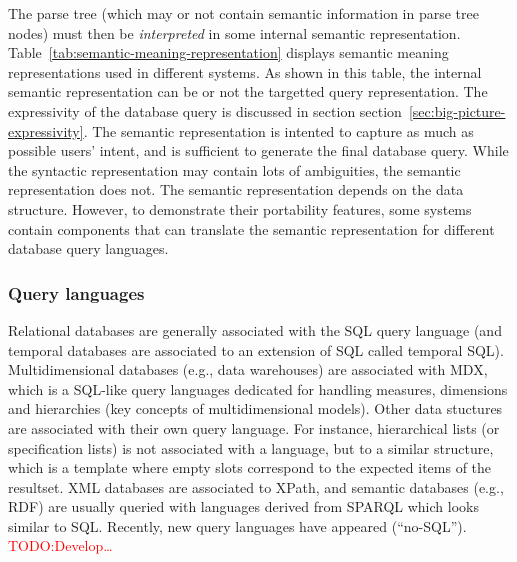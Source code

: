 \documentclass[10pt,journal,letterpaper,compsoc]{IEEEtran}
\newcommand\TODO[1]{{\textcolor{red}{TODO:#1}}}
\begin{document}
The parse tree (which may or not contain semantic information in parse tree
nodes) must then be {\it interpreted} in some internal semantic representation.
Table~\ref{tab:semantic-meaning-representation} displays semantic meaning
representations used in different systems.
As shown in this table, the internal semantic representation can be or not the
targetted query representation. 
The expressivity of the database query is discussed in section
section~\ref{sec:big-picture-expressivity}. 
The semantic representation is intented to capture as much as possible users'
intent, and is sufficient to generate the final database query. 
While the syntactic representation may contain lots of ambiguities, the semantic
representation does not. 
The semantic representation depends on the data structure. However, to
demonstrate their portability features, some systems contain components that
can translate the semantic representation for different database query
languages.

\subsubsection{Query languages}
Relational databases are generally associated with the SQL query language (and
temporal databases are associated to an extension of SQL called temporal SQL).
Multidimensional databases (e.g., data warehouses) are associated with MDX,
which is a SQL-like query languages dedicated for handling measures, dimensions
and hierarchies (key concepts of multidimensional models).
Other data stuctures are associated with their own query language. For instance,
hierarchical lists (or specification lists) is not associated with a language,
but to a similar structure, which is a template where empty slots correspond to
the expected items of the resultset. XML databases are associated to XPath, and
semantic databases (e.g., RDF) are usually queried with languages derived from
SPARQL which looks similar to SQL.
Recently, new query languages have appeared (``no-SQL''). 
\TODO{Develop\ldots}
\end{document}
